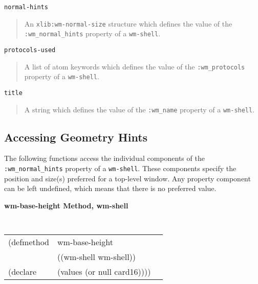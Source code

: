 \begin{flushright} \parbox[t]{6.125in}{
{\tt normal-hints}
\begin{quote}
An {\tt xlib:wm-normal-size} structure which defines the value of the
{\tt :wm\_normal\_hints} property of a {\tt wm-shell}. 
\end{quote}
}\end{flushright}

\begin{flushright} \parbox[t]{6.125in}{
{\tt protocols-used}
\begin{quote}
A list of atom keywords which defines the value of the
{\tt :wm\_protocols} property of a {\tt wm-shell}.
\end{quote}

}\end{flushright}

\begin{flushright} \parbox[t]{6.125in}{
{\tt title   }
\begin{quote}
A string which defines the value of the
{\tt :wm\_name} property of a {\tt wm-shell}. 
\end{quote}

}\end{flushright}

{\samepage
\subsection*{Accessing Geometry Hints}

The following functions access the individual components of the {\tt
:wm\_normal\_hints} property of a {\tt wm-shell}. These components specify the
position and size(s) preferred for a top-level window. Any property component
can be left undefined, which means that there is no preferred value.

}

{\samepage
{\large {\bf wm-base-height \hfill Method, wm-shell}}
\begin{flushright} \parbox[t]{6.125in}{
\tt
\begin{tabular}{lll}
\raggedright
(defmethod & wm-base-height & \\
           & ((wm-shell  wm-shell)) \\
(declare   & (values (or null card16))))
\end{tabular}
\rm

}\end{flushright}}

